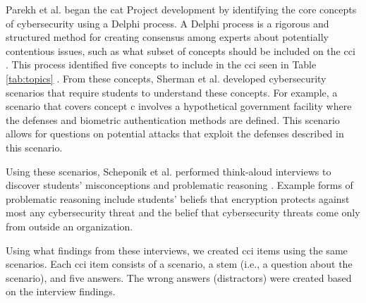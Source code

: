 Parekh et al. \cite{delphi} began the \gls{cat} Project development by identifying the core concepts of cybersecurity using a Delphi process. A Delphi process is a rigorous and structured method for creating consensus among experts about potentially contentious issues, such as what subset of concepts should be included on the \gls{cci} \cite{original_delphi}. This process identified five concepts to include in the \gls{cci} seen in Table \ref{tab:topics} \cite{delphi}. From these concepts, Sherman et al. \cite{scenarios} developed cybersecurity scenarios that require students to understand these concepts. For example, a scenario that covers concept \gls{c} involves a hypothetical government facility where the defenses and biometric authentication methods are defined. This scenario allows for questions on potential attacks that exploit the defenses described in this scenario.

Using these scenarios, Scheponik et al. \cite{misconceptions} performed think-aloud interviews to discover students' misconceptions and problematic reasoning \cite{jcerp}. Example forms of problematic reasoning include students' beliefs that encryption protects against most any cybersecurity threat and the belief that cybersecurity threats come only from outside an organization.

Using what findings from these interviews, we created \gls{cci} items using the same scenarios. Each \gls{cci} item consists of a scenario, a stem (i.e., a question about the scenario), and five answers. The wrong answers (distractors) were created based on the interview findings.